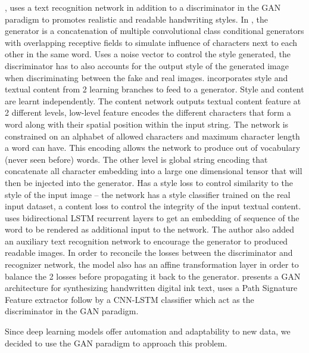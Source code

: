 \documentclass[12pt]{report}
\begin{document}
\cite{scrabble-gan}, \cite{gan-writting} uses a text recognition network in addition to a discriminator in the GAN paradigm to promotes realistic and readable handwriting styles. In \cite{scrabble-gan}, the generator is a concatenation of multiple convolutional class conditional generators with overlapping receptive fields to simulate influence of characters next to each other in the same word.
Uses a noise vector to control the style generated, the discriminator has to also accounts for the output style of the generated image when discriminating between the fake and real images.
\cite{gan-writting} incorporates style and textual content from 2 learning branches to feed to a generator. Style and content are learnt independently. The content network outputs textual content feature at 2 different levels, low-level feature encodes the different characters that form a word along with their spatial position within the input string. The network is constrained on an alphabet of allowed characters and maximum character length a word can have. This encoding allows the network to produce out of vocabulary (never seen before) words. The other level is global string encoding that concatenate all character embedding into a large one dimensional tensor that will then be injected into the generator.
Has a style loss to control similarity to the style of the input image – the network has a style classifier trained on the real input dataset, a content loss to control the integrity of the input textual content.
\cite{adversarial-gen} uses bidirectional LSTM recurrent layers \cite{lstm} to get an embedding of sequence of the word to be rendered as additional input to the network. The author also added an auxiliary text recognition network to encourage the generator to produced readable images. In order to reconcile the losses between the discriminator and recognizer network, the model also has an affine transformation layer in order to balance the 2 losses before propagating it back to the generator.
\cite{hw-gan} presents a GAN architecture for synthesizing handwritten digital ink text, uses a Path Signature Feature extractor follow by a CNN-LSTM classifier which act as the discriminator in the GAN paradigm.

Since deep learning models offer automation and adaptability to new data, we decided to use the GAN paradigm to approach this problem.
\end{document}
